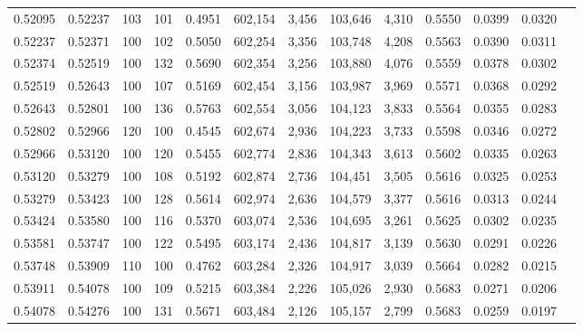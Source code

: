 \begin{tabular}{rrrrrrrrrrrrr}
0.52095 & 0.52237 &   103 & 101 &                                     0.4951 & 602,154 &   3,456 & 103,646 &   4,310 & 0.5550 & 0.0399 & 0.0320 \\
0.52237 & 0.52371 &   100 & 102 &                                     0.5050 & 602,254 &   3,356 & 103,748 &   4,208 & 0.5563 & 0.0390 & 0.0311 \\
0.52374 & 0.52519 &   100 & 132 &                                     0.5690 & 602,354 &   3,256 & 103,880 &   4,076 & 0.5559 & 0.0378 & 0.0302 \\
0.52519 & 0.52643 &   100 & 107 &                                     0.5169 & 602,454 &   3,156 & 103,987 &   3,969 & 0.5571 & 0.0368 & 0.0292 \\
0.52643 & 0.52801 &   100 & 136 &                                     0.5763 & 602,554 &   3,056 & 104,123 &   3,833 & 0.5564 & 0.0355 & 0.0283 \\
0.52802 & 0.52966 &   120 & 100 &                                     0.4545 & 602,674 &   2,936 & 104,223 &   3,733 & 0.5598 & 0.0346 & 0.0272 \\
0.52966 & 0.53120 &   100 & 120 &                                     0.5455 & 602,774 &   2,836 & 104,343 &   3,613 & 0.5602 & 0.0335 & 0.0263 \\
0.53120 & 0.53279 &   100 & 108 &                                     0.5192 & 602,874 &   2,736 & 104,451 &   3,505 & 0.5616 & 0.0325 & 0.0253 \\
0.53279 & 0.53423 &   100 & 128 &                                     0.5614 & 602,974 &   2,636 & 104,579 &   3,377 & 0.5616 & 0.0313 & 0.0244 \\
0.53424 & 0.53580 &   100 & 116 &                                     0.5370 & 603,074 &   2,536 & 104,695 &   3,261 & 0.5625 & 0.0302 & 0.0235 \\
0.53581 & 0.53747 &   100 & 122 &                                     0.5495 & 603,174 &   2,436 & 104,817 &   3,139 & 0.5630 & 0.0291 & 0.0226 \\
0.53748 & 0.53909 &   110 & 100 &                                     0.4762 & 603,284 &   2,326 & 104,917 &   3,039 & 0.5664 & 0.0282 & 0.0215 \\
0.53911 & 0.54078 &   100 & 109 &                                     0.5215 & 603,384 &   2,226 & 105,026 &   2,930 & 0.5683 & 0.0271 & 0.0206 \\
0.54078 & 0.54276 &   100 & 131 &                                     0.5671 & 603,484 &   2,126 & 105,157 &   2,799 & 0.5683 & 0.0259 & 0.0197 \\

\end{tabular}
